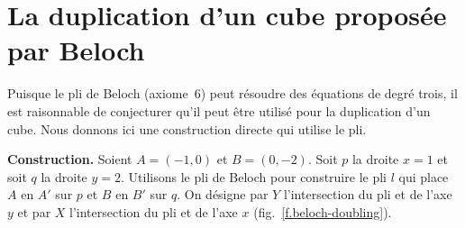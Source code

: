 \section{La duplication d'un cube proposée par Beloch}\label{s.cube2}


Puisque le pli de Beloch (axiome~6) peut résoudre des équations de degré trois, il est raisonnable de conjecturer qu'il peut être utilisé pour la duplication d'un cube. Nous donnons ici une construction directe qui utilise le pli.

\medskip

\noindent\textbf{Construction.}
Soient $A=(-1,0)$ et $B=(0,-2)$. Soit $p$ la droite $x=1$ et soit $q$ la droite $y=2$. Utilisons le pli de Beloch pour construire le pli $l$ qui place $A$ en $A'$ sur $p$ et $B$ en $B'$ sur $q$. On désigne par $Y$ l'intersection du pli et de l'axe $y$ et par $X$ l'intersection du pli et de l'axe $x$ (fig.~\ref{f.beloch-doubling}).

